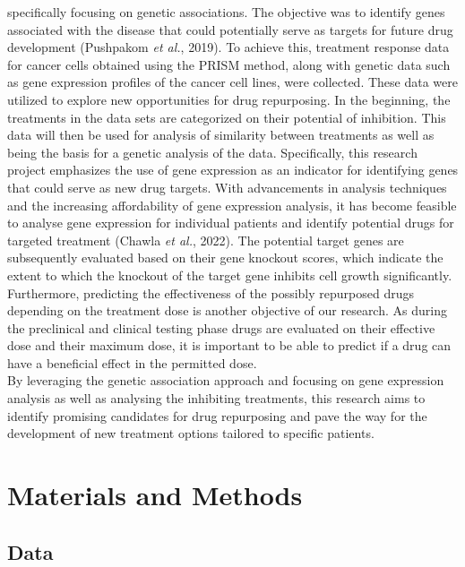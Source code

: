 \documentclass[
  11pt,
]{article}
\begin{document}
specifically focusing on genetic associations. The objective was to
identify genes associated with the disease that could potentially serve
as targets for future drug development (Pushpakom \emph{et al.}, 2019).
To achieve this, treatment response data for cancer cells obtained using
the PRISM method, along with genetic data such as gene expression
profiles of the cancer cell lines, were collected. These data were
utilized to explore new opportunities for drug repurposing. In the
beginning, the treatments in the data sets are categorized on their
potential of inhibition. This data will then be used for analysis of
similarity between treatments as well as being the basis for a genetic
analysis of the data. Specifically, this research project emphasizes the
use of gene expression as an indicator for identifying genes that could
serve as new drug targets. With advancements in analysis techniques and
the increasing affordability of gene expression analysis, it has become
feasible to analyse gene expression for individual patients and identify
potential drugs for targeted treatment (Chawla \emph{et al.}, 2022). The
potential target genes are subsequently evaluated based on their gene
knockout scores, which indicate the extent to which the knockout of the
target gene inhibits cell growth significantly. Furthermore, predicting
the effectiveness of the possibly repurposed drugs depending on the
treatment dose is another objective of our research. As during the
preclinical and clinical testing phase drugs are evaluated on their
effective dose and their maximum dose, it is important to be able to
predict if a drug can have a beneficial effect in the permitted dose.\\
By leveraging the genetic association approach and focusing on gene
expression analysis as well as analysing the inhibiting treatments, this
research aims to identify promising candidates for drug repurposing and
pave the way for the development of new treatment options tailored to
specific patients.

\hypertarget{materials-and-methods}{%
\section{Materials and Methods}\label{materials-and-methods}}

\hypertarget{data}{%
\subsection{Data}\label{data}}
\end{document}
